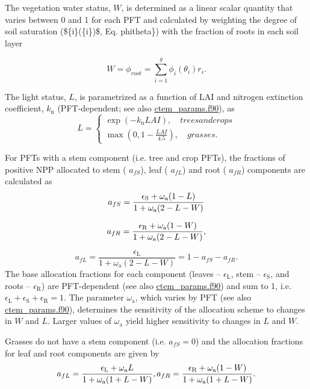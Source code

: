 The vegetation water status, $W$, is determined as a linear scalar quantity that varies between 0 and 1 for each P\+F\+T and calculated by weighting the degree of soil saturation (\$\{i\}(\{i\})\$, Eq. phitheta\}) with the fraction of roots in each soil layer

\[ \label{degsoilsat} W = \phi_{root} = \sum_{i=1}^g \phi_{i}(\theta_{i}) r_{i}. \]

The light status, $L$, is parametrized as a function of L\+A\+I and nitrogen extinction coefficient, $k_\mathrm{n}$ (P\+F\+T-\/dependent; see also \hyperlink{ctem__params_8f90}{ctem\+\_\+params.\+f90}), as \[ L = \begin{cases} \exp(-k_\mathrm{n} LAI), \quad trees and crops \\ \max\left(0,1-\frac{LAI}{4.5}\right),\quad grasses. \end{cases} \]

For P\+F\+Ts with a stem component (i.\+e. tree and crop P\+F\+Ts), the fractions of positive N\+P\+P allocated to stem ( $a_{fS}$), leaf ( $a_{fL}$) and root ( $a_{fR}$) components are calculated as \[ \label{As} a_{fS}=\frac{\epsilon_\mathrm{S}+\omega_\mathrm{a}(1-L)}{1+\omega_\mathrm{a}(2-L-W)} \vspace*{-4mm} \]

\[ \label{Ar} a_{fR}=\frac{\epsilon_\mathrm{R}+ \omega_\mathrm{a}(1-W)}{1+\omega_\mathrm{a}(2-L-W)}, \vspace*{-4mm}\]

\[ \label{Al} a_{fL}=\frac{\epsilon_\mathrm{L}}{1+\omega_\mathrm{a}(2-L-W)}= 1-a_{fS}-a_{fR}. \] The base allocation fractions for each component (leaves -- $\epsilon_\mathrm{L}$, stem -- $\epsilon_\mathrm{S}$, and roots -- $\epsilon_\mathrm{R}$) are P\+F\+T-\/dependent (see also \hyperlink{ctem__params_8f90}{ctem\+\_\+params.\+f90}) and sum to 1, i.\+e. $\epsilon_\mathrm{L} + \epsilon_\mathrm{S} + \epsilon_\mathrm{R} = 1$. The parameter $\omega_\mathrm{a}$, which varies by P\+F\+T (see also \hyperlink{ctem__params_8f90}{ctem\+\_\+params.\+f90}), determines the sensitivity of the allocation scheme to changes in $W$ and $L$. Larger values of $\omega_\mathrm{a}$ yield higher sensitivity to changes in $L$ and $W$.

Grasses do not have a stem component (i.\+e. $a_{fS}=0$) and the allocation fractions for leaf and root components are given by \[ a_{fL}=\frac{\epsilon_\mathrm{L}+\omega_\mathrm{a} L}{1+\omega_\mathrm{a}(1+L-W)},\\ a_{fR}=\frac{\epsilon_\mathrm{R}+\omega_\mathrm{a}(1-W)}{1+\omega_\mathrm{a}(1+L-W)}.\]

